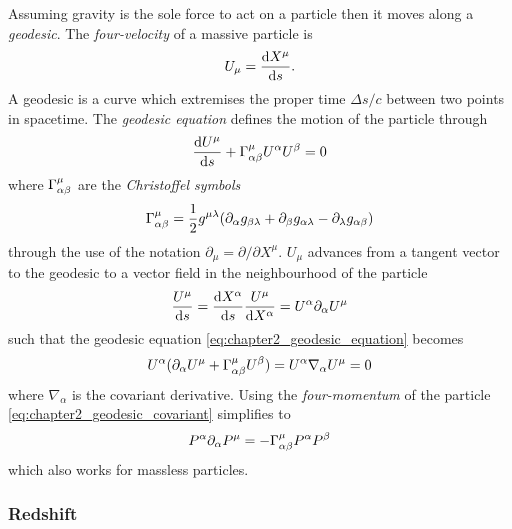 Assuming gravity is the sole force to act on a particle then it moves along a \emph{geodesic}.
The \emph{four-velocity} of a massive particle is
%
\begin{equation}
	U_{\mu}
	= \dv{X^{\mu}}{s}.
\end{equation}
%
A geodesic is a curve which extremises the proper time \(\Delta s/c\) between two points in spacetime. The \emph{geodesic equation} defines the motion of the particle through
%
\begin{equation}\label{eq:chapter2_geodesic_equation}
	\dv{U^{\mu}}{s} + \Gamma^{\mu}_{\alpha\beta} U^{\alpha} U^{\beta}
	= 0
\end{equation}
%
where \(\Gamma^{\mu}_{\alpha\beta}\) are the \emph{Christoffel symbols}
%
\begin{equation}
	\Gamma^{\mu}_{\alpha\beta}
	= \frac{1}{2} g^{\mu\lambda}
	(\partial_{\alpha}g_{\beta\lambda}
	+ \partial_{\beta}g_{\alpha\lambda}
	- \partial_{\lambda}g_{\alpha\beta})
\end{equation}
%
through the use of the notation \(\partial_{\mu} = \partial/\partial X^{\mu}\).
\(U_{\mu}\) advances from a tangent vector to the geodesic to a vector field in the neighbourhood of the particle
%
\begin{equation}
	\frac{U^{\mu}}{\dd{s}}
	= \dv{X^{\alpha}}{s} \frac{U^{\mu}}{\dd{X^{\alpha}}}
	= U^{\alpha} \partial_{\alpha} U^{\mu}
\end{equation}
%
such that the geodesic equation \cref{eq:chapter2_geodesic_equation} becomes
%
\begin{equation}\label{eq:chapter2_geodesic_covariant}
	U^{\alpha} (\partial_{\alpha} U^{\mu} + \Gamma^{\mu}_{\alpha\beta} U^{\beta})
	= U^{\alpha} \nabla_{\alpha} U^{\mu}
	= 0
\end{equation}
%
where \(\nabla_{\alpha}\) is the covariant derivative.
Using the \emph{four-momentum} of the particle \cref{eq:chapter2_geodesic_covariant} simplifies to
%
\begin{equation}
	P^{\alpha} \partial_{\alpha} P^{\mu}
	= -\Gamma^{\mu}_{\alpha\beta} P^{\alpha} P^{\beta}
\end{equation}
%
which also works for massless particles.

\subsubsection{Redshift}

